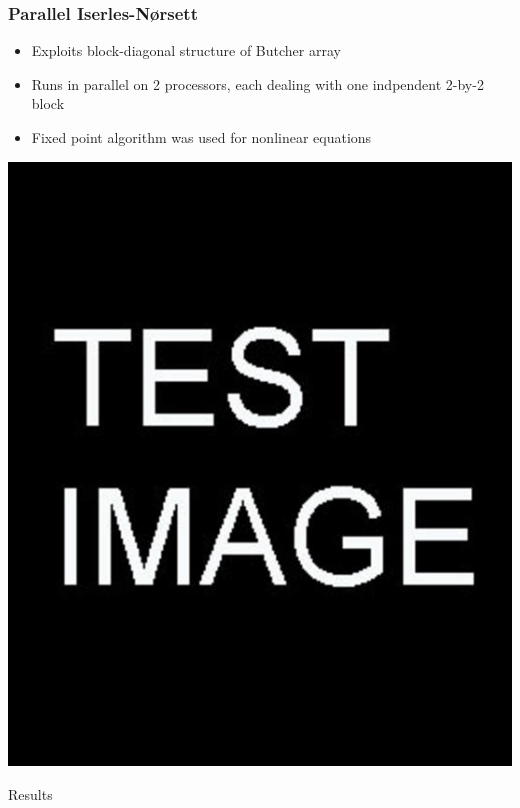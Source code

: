 \documentclass{beamer}
\begin{document}
\begin{frame} %
	\frametitle{Parallel Iserles-Nørsett}
	\begin{itemize}
		\item Exploits block-diagonal structure of Butcher array
		\item Runs in parallel on 2 processors, each dealing with one indpendent 2-by-2 block
		\item Fixed point algorithm was used for nonlinear equations
	\end{itemize}
	\includegraphics[scale=0.2]{etc/test.jpg}
\end{frame}


\begin{frame}[c] %
\begin{center}
	\Huge \color{blue} Results
\end{center}
\end{frame}
\end{document}
